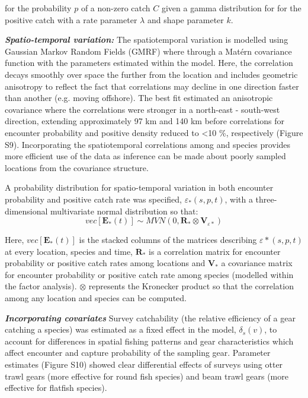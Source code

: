 \documentclass{nature}
\begin{document}
\begin{linenumbers}
for the probability $p$ of a non-zero catch $C$ given a gamma distribution for
for the positive catch with a rate parameter $\lambda$ and shape parameter $k$.

\textbf{\textit{Spatio-temporal variation:}} The spatiotemporal variation is
modelled using Gaussian Markov Random Fields (GMRF) where
through a Matérn covariance function with the parameters
estimated within the model. Here, the correlation decays smoothly over space
the further from the location and includes geometric anisotropy to reflect the
fact that correlations may decline in one direction faster than another (e.g.
moving offshore)\cite{Thorson2013}.  The best fit estimated an anisotropic
covariance where the correlations were stronger in a north-east - south-west
direction, extending approximately 97 km and 140 km before correlations for
encounter probability and positive density reduced to \textless 10 \%,
respectively (Figure S9).  Incorporating the spatiotemporal correlations among
and species provides more efficient use of the data as inference
can be made about poorly sampled locations from the covariance structure.

A probability distribution for spatio-temporal variation in both encounter
probability and positive catch rate was specified, $\varepsilon_{*}(s,p,t)$,
with a three-dimensional multivariate normal distribution so that:
	\begin{equation}
		vec[\mathbf{E}_{*}(t)] \sim MVN(0,\mathbf{R}_{*} \otimes
		\mathbf{V}_{{\varepsilon}{*}})
	\end{equation}

Here, $vec[\mathbf{E}_{*}(t)]$ is the stacked columns of the matrices
describing $\varepsilon{*}(s,p,t)$ at every location, species and time,
$\mathbf{R}_{*}$ is a correlation matrix for encounter probability or positive
catch rates among locations and $\mathbf{V}_{*}$ a covariance matrix for
encounter probability or positive catch rate among species (modelled
within the factor analysis). $\otimes$ represents the Kronecker product so that
the correlation among any location and species can be computed\cite{Thorson2017}.
		
\textbf{\textit{Incorporating covariates}} Survey catchability (the relative
efficiency of a gear catching a species) was estimated as a fixed effect
in the model, $\delta_{s}(v)$, to account for differences in spatial fishing
patterns and gear characteristics which affect encounter and capture
probability of the sampling gear\cite{Thorson2014}. Parameter estimates
(Figure S10) showed clear differential effects of surveys using otter trawl
gears (more effective for round fish species) and beam trawl gears (more
effective for flatfish species).


\end{linenumbers}
\end{document}
